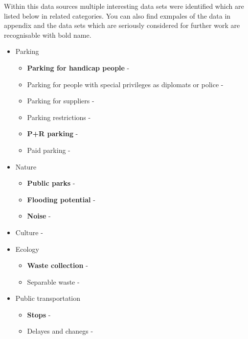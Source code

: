 \documentclass{article}
\begin{document}
Within this data sources multiple interesting data sets were identified which are listed below in related categories. You can also find exmpales of the data in appendix and the data sets which are seriously considered for further work are recognisable with bold name.

\begin{itemize}
    \item Parking
    \begin{itemize}
        \item \textbf{Parking for handicap people} - \cite{Vyhrazen70:online,Vyhrazen35:online}
        \item Parking for people with special privileges as diplomats or police -  \cite{Vyhrazen81:online}
        \item Parking for suppliers - \cite{Vyhrazen63:online} 
        \item Parking restrictions - \cite{zakazy:online}
        \item \textbf{P+R parking} - \cite{wwwtskpr83:online,Zachytna0:online}
        \item Paid parking - \cite{usekypar48:online,Zonyplac33:online}
    \end{itemize}
    \item Nature
        \begin{itemize}
            \item \textbf{Public parks} - \cite{parky:online}
            \item \textbf{Flooding potential} - \cite{zaplavy:online}
            \item \textbf{Noise} - \cite{hluk1:online,hluk2:online}
        \end{itemize}
    \item Culture - \cite{kudyznudy:online,informujpraha:online}
    \item Ecology
        \begin{itemize}
            \item \textbf{Waste collection} - \cite{Velkoobj59:online,Harmonog59:online,McPraha279:online,Velkoobj47:online}
            \item Separable waste - \cite{Stanovis12:online,Stanovis75:online}
        \end{itemize}
    \item Public transportation
        \begin{itemize}
            \item \textbf{Stops} - \cite{Vstupydo88:online}
            \item Delayes and chanegs - \cite{DPPczZme13:online,DPPczMim53:online}

\end{itemize}
\end{itemize}
\end{document}
